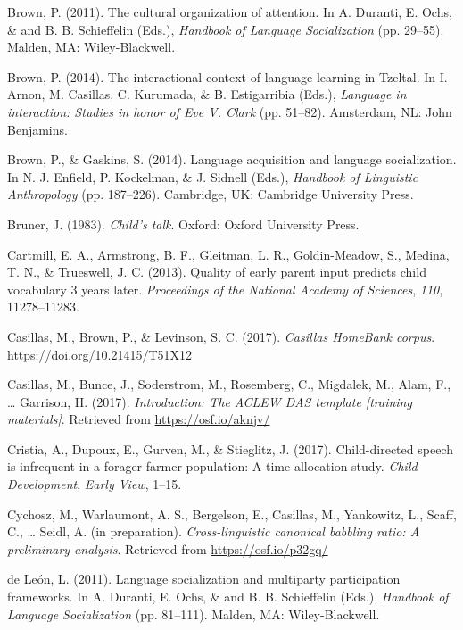 \documentclass[floatsintext,man]{apa6}
\theoremstyle{definition}
\theoremstyle{definition}
\theoremstyle{definition}
\theoremstyle{remark}
\begin{document}
\hypertarget{ref-brown2011cultural}{}
Brown, P. (2011). The cultural organization of attention. In A. Duranti,
E. Ochs, \& and B. B. Schieffelin (Eds.), \emph{Handbook of Language
Socialization} (pp. 29--55). Malden, MA: Wiley-Blackwell.

\hypertarget{ref-brown2014interactional}{}
Brown, P. (2014). The interactional context of language learning in
Tzeltal. In I. Arnon, M. Casillas, C. Kurumada, \& B. Estigarribia
(Eds.), \emph{Language in interaction: Studies in honor of Eve V. Clark}
(pp. 51--82). Amsterdam, NL: John Benjamins.

\hypertarget{ref-brown2014language}{}
Brown, P., \& Gaskins, S. (2014). Language acquisition and language
socialization. In N. J. Enfield, P. Kockelman, \& J. Sidnell (Eds.),
\emph{Handbook of Linguistic Anthropology} (pp. 187--226). Cambridge,
UK: Cambridge University Press.

\hypertarget{ref-bruner1983childs}{}
Bruner, J. (1983). \emph{Child's talk}. Oxford: Oxford University Press.

\hypertarget{ref-cartmill2013quality}{}
Cartmill, E. A., Armstrong, B. F., Gleitman, L. R., Goldin-Meadow, S.,
Medina, T. N., \& Trueswell, J. C. (2013). Quality of early parent input
predicts child vocabulary 3 years later. \emph{Proceedings of the
National Academy of Sciences}, \emph{110}, 11278--11283.

\hypertarget{ref-Casillas-HB}{}
Casillas, M., Brown, P., \& Levinson, S. C. (2017). \emph{Casillas
HomeBank corpus}. \url{https://doi.org/10.21415/T51X12}

\hypertarget{ref-casillas2017ACLEWDAS}{}
Casillas, M., Bunce, J., Soderstrom, M., Rosemberg, C., Migdalek, M.,
Alam, F., \ldots{} Garrison, H. (2017). \emph{Introduction: The ACLEW
DAS template {[}training materials{]}}. Retrieved from
\url{https://osf.io/aknjv/}

\hypertarget{ref-cristia2017child}{}
Cristia, A., Dupoux, E., Gurven, M., \& Stieglitz, J. (2017).
Child-directed speech is infrequent in a forager-farmer population: A
time allocation study. \emph{Child Development}, \emph{Early View},
1--15.

\hypertarget{ref-cychoszIPchivocOSF}{}
Cychosz, M., Warlaumont, A. S., Bergelson, E., Casillas, M., Yankowitz,
L., Scaff, C., \ldots{} Seidl, A. (in preparation).
\emph{Cross-linguistic canonical babbling ratio: A preliminary
analysis}. Retrieved from \url{https://osf.io/p32gq/}

\hypertarget{ref-deleon2011language}{}
de León, L. (2011). Language socialization and multiparty participation
frameworks. In A. Duranti, E. Ochs, \& and B. B. Schieffelin (Eds.),
\emph{Handbook of Language Socialization} (pp. 81--111). Malden, MA:
Wiley-Blackwell.
\end{document}

